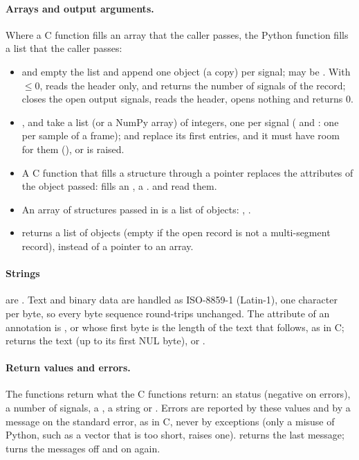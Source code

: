 \paragraph{Arrays and output arguments.} Where a C function fills an array that the caller
passes, the Python function fills a list that the caller passes:
\begin{itemize}
\item {} and  empty the list  and append one
   object (a copy) per signal;  may be . With
   $\le 0$,  reads the header only, and returns the number of
  signals of the record;  closes the open output signals,
  reads the header, opens nothing and returns 0.
\item {},  and  take a list (or a NumPy array) of
  integers, one per signal ( and : one per sample of a
  frame);  and  replace its first entries, and it must have
  room for them (), or  is raised.
\item A C function that fills a structure through a pointer replaces the attributes of
  the object passed:  fills an ,
   a .  and
   read them.
\item An array of structures passed in is a list of objects: , .
\item {} returns a list of  objects (empty if the open
  record is not a multi-segment record), instead of a pointer to an array.
\end{itemize}

\paragraph{Strings} are . Text and binary data are handled as ISO-8859-1
(Latin-1), one character per byte, so every byte sequence round-trips unchanged. The
 attribute of an annotation is , or  whose first byte is
the length of the text that follows, as in C;  returns the
text (up to its first NUL byte), or .

\paragraph{Return values and errors.} The functions return what the C functions return:
an  status (negative on errors), a number of signals, a , a string
or . Errors are reported by these values and by a message on the standard
error, as in C, never by exceptions (only a misuse of Python, such as a vector that is too
short, raises one).  returns the last message;  turns
the messages off and  on again.


